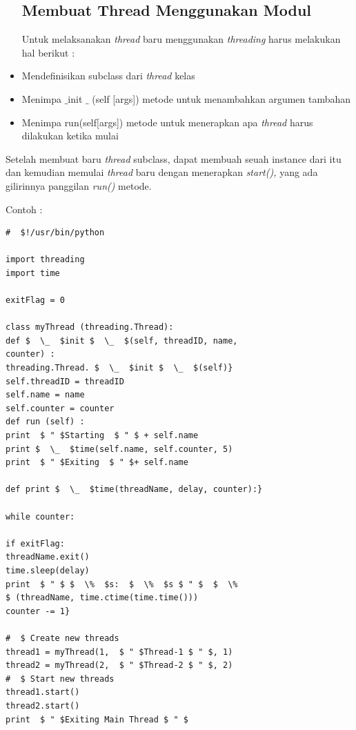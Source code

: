\begin{itemize}
\subsection {Membuat Thread Menggunakan Modul} \par
\hspace*{0.5in} Untuk melaksanakan \textit{thread}\textit{ }baru menggunakan\textit{ threading} harus melakukan hal berikut : \par
\item Mendefinisikan subclass dari \textit{thread} kelas \par
\item Menimpa  $  \_  $init $  \_  $ (self [args]) metode untuk menambahkan argumen tambahan \par
\item Menimpa run(self[args]) metode untuk menerapkan apa \textit{thread} harus dilakukan ketika mulai 
\end{itemize}

\vspace{12pt}
\hspace*{0.5in} Setelah membuat baru \textit{thread} subclass, dapat membuah seuah instance dari itu dan kemudian memulai \textit{thread} baru dengan menerapkan \textit{start(),} yang ada gilirinnya panggilan \textit{run()} metode. \par
\vspace{50pt}

Contoh :
\begin{verbatim} 
#  $!/usr/bin/python

import threading
import time

exitFlag = 0

class myThread (threading.Thread): 
def $  \_  $init $  \_  $(self, threadID, name, 
counter) :
threading.Thread. $  \_  $init $  \_  $(self)} 
self.threadID = threadID
self.name = name 
self.counter = counter 
def run (self) :
print  $ " $Starting  $ " $ + self.name 
print $  \_  $time(self.name, self.counter, 5)
print  $ " $Exiting  $ " $+ self.name

def print $  \_  $time(threadName, delay, counter):} 

while counter:

if exitFlag: 
threadName.exit() 
time.sleep(delay) 
print  $ " $ $  \%  $s:  $  \%  $s $ " $  $  \%  
$ (threadName, time.ctime(time.time()))
counter -= 1} 

#  $ Create new threads
thread1 = myThread(1,  $ " $Thread-1 $ " $, 1)
thread2 = myThread(2,  $ " $Thread-2 $ " $, 2)
#  $ Start new threads
thread1.start()
thread2.start()
print  $ " $Exiting Main Thread $ " $
\end{verbatim}

